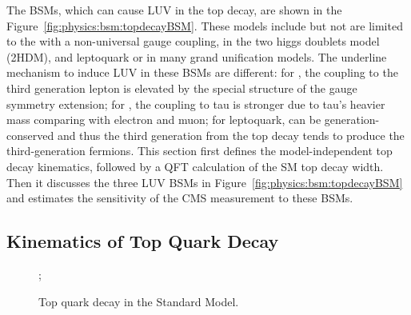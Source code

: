 The BSMs, which can cause LUV in the top decay, are shown in the Figure~\ref{fig:physics:bsm:topdecayBSM}. These models include but not are limited to the \PWpr with a non-universal gauge coupling, \PSHp in the two higgs doublets model (2HDM), and leptoquark or \PLQ in many grand unification models. The underline mechanism to induce LUV in these BSMs are different: for \PWpr, the coupling to the third generation lepton is elevated by the special structure of the gauge symmetry extension; for \PSHp, the coupling to tau is stronger due to tau's heavier mass comparing with electron and muon; for leptoquark, \PLQ can be generation-conserved and thus the third generation \PLQ from the top decay tends to produce the third-generation fermions. This section first defines the model-independent top decay kinematics, followed by a QFT calculation of the SM top decay width. Then it discusses the three LUV BSMs in Figure~\ref{fig:physics:bsm:topdecayBSM} and estimates the sensitivity of the CMS \BWl measurement to these BSMs.



\subsection{Kinematics of Top Quark Decay}
\label{sec:physics:bsm:kinematics}

\begin{figure}[ht]
    \centering
    ;
    \caption{Top quark decay in the Standard Model.}
    \label{fig:physics:bsm:topdecaySM}
\end{figure}

